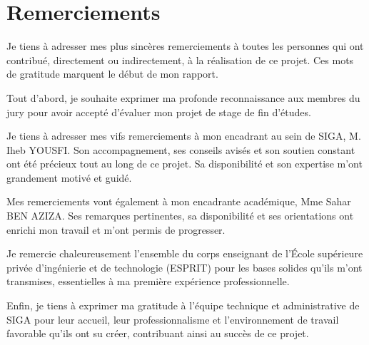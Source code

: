 \chapter*{\huge Remerciements}

\begin{center}
Je tiens à adresser mes plus sincères remerciements à toutes les personnes qui ont contribué, directement ou indirectement, à la réalisation de ce projet. Ces mots de gratitude marquent le début de mon rapport.

\vspace{0.6\baselineskip}
Tout d’abord, je souhaite exprimer ma profonde reconnaissance aux membres du jury pour avoir accepté d’évaluer mon projet de stage de fin d’études.

\vspace{0.6\baselineskip}
Je tiens à adresser mes vifs remerciements à mon encadrant au sein de SIGA, M. Iheb YOUSFI. Son accompagnement, ses conseils avisés et son soutien constant ont été précieux tout au long de ce projet. Sa disponibilité et son expertise m’ont grandement motivé et guidé.

\vspace{0.6\baselineskip}
Mes remerciements vont également à mon encadrante académique, Mme Sahar BEN AZIZA. Ses remarques pertinentes, sa disponibilité et ses orientations ont enrichi mon travail et m’ont permis de progresser.

\vspace{0.6\baselineskip}
Je remercie chaleureusement l’ensemble du corps enseignant de l’École supérieure privée d’ingénierie et de technologie (ESPRIT) pour les bases solides qu’ils m’ont transmises, essentielles à ma première expérience professionnelle.

\vspace{0.6\baselineskip}
Enfin, je tiens à exprimer ma gratitude à l’équipe technique et administrative de SIGA pour leur accueil, leur professionnalisme et l’environnement de travail favorable qu’ils ont su créer, contribuant ainsi au succès de ce projet.

\end{center}